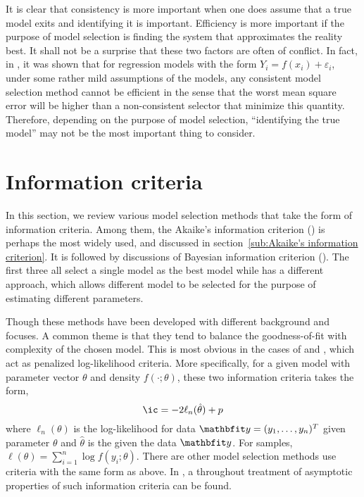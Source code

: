 It is clear that consistency is more important when one does assume that a
true model exits and identifying it is important. Efficiency is more important
if the purpose of model selection is finding the system that approximates the
reality best. It shall not be a surprise that these two factors are often of
conflict. In fact, in \cite{Yang:2005vj},  it was shown that for
regression models with the form $Y_i = f(x_i) + \varepsilon_i$, under some
rather mild assumptions of the models, any consistent model selection method
cannot be efficient in the sense that the worst mean square error will be
higher than a non-consistent selector that minimize this quantity. Therefore,
depending on the purpose of model selection, ``identifying the true model''
may not be the most important thing to consider.

\section{Information criteria}
\label{sec:Information criteria}

In this section, we review various model selection methods that take the form
of information criteria. Among them, the Akaike's information criterion (\aic)
is perhaps the most widely used, and discussed in section~\ref{sub:Akaike's
  information criterion}. It is followed by discussions of Bayesian
information criterion (\bic). The first three all select a single model as the
best model while \fic has a different approach, which allows different model
to be selected for the purpose of estimating different parameters.

Though these methods have been developed with different background and
focuses. A common theme is that they tend to balance the goodness-of-fit with
complexity of the chosen model. This is most obvious in the cases of \aic and
\bic, which act as penalized log-likelihood criteria. More specifically, for a
given model with parameter vector $\theta$ and density $f(\cdot;\theta)$,
these two information criteria takes the form,
\begin{equation}
  \text{\ic} = -2\ell_n(\hat\theta) + p
  \label{eq:ic}
\end{equation}
where $\ell_n(\theta)$ is the log-likelihood for data $\data =
(y_1,\dots,y_n)^T$ given parameter $\theta$ and $\hat\theta$ is the \mle given
the data $\data$. For \iid samples, $\ell(\theta) = \sum_{i=1}^n\log
f(y_i;\theta)$. There are other model selection methods use criteria with the
same form as above. In \cite{Sin:1996vs}, a throughout treatment of asymptotic
properties of such information criteria can be found.

